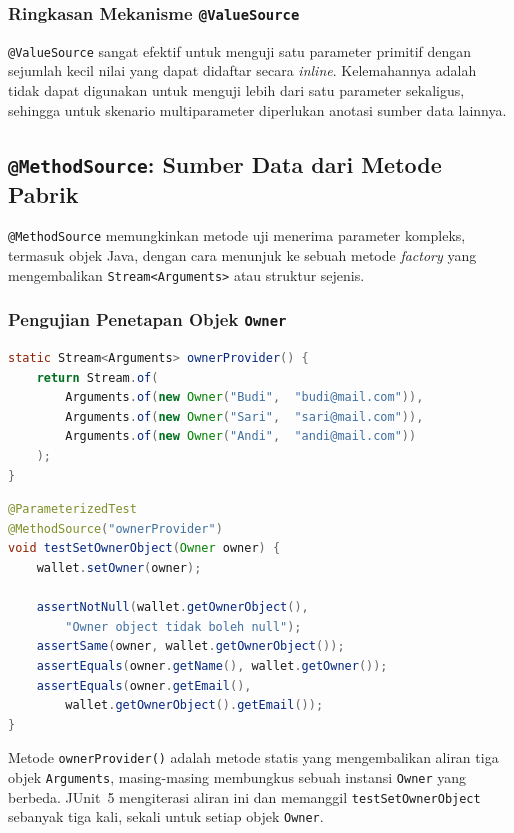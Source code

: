 \documentclass[12pt,a4paper]{article}
\begin{document}
\subsubsection{Ringkasan Mekanisme \texttt{@ValueSource}}

\texttt{@ValueSource} sangat efektif untuk menguji satu parameter primitif dengan
sejumlah kecil nilai yang dapat didaftar secara \textit{inline}.  Kelemahannya adalah
tidak dapat digunakan untuk menguji lebih dari satu parameter sekaligus, sehingga untuk
skenario multiparameter diperlukan anotasi sumber data lainnya.

\subsection{\texttt{@MethodSource}: Sumber Data dari Metode Pabrik}

\texttt{@MethodSource} memungkinkan metode uji menerima parameter kompleks, termasuk
objek Java, dengan cara menunjuk ke sebuah metode \textit{factory} yang mengembalikan
\texttt{Stream<Arguments>} atau struktur sejenis.

\subsubsection{Pengujian Penetapan Objek \texttt{Owner}}

\begin{lstlisting}[language=Java, caption={Metode pabrik data untuk \texttt{@MethodSource}}]
static Stream<Arguments> ownerProvider() {
    return Stream.of(
        Arguments.of(new Owner("Budi",  "budi@mail.com")),
        Arguments.of(new Owner("Sari",  "sari@mail.com")),
        Arguments.of(new Owner("Andi",  "andi@mail.com"))
    );
}
\end{lstlisting}

\begin{lstlisting}[language=Java, caption={Pengujian \texttt{setOwner(Owner)} dengan \texttt{@MethodSource}}]
@ParameterizedTest
@MethodSource("ownerProvider")
void testSetOwnerObject(Owner owner) {
    wallet.setOwner(owner);

    assertNotNull(wallet.getOwnerObject(),
        "Owner object tidak boleh null");
    assertSame(owner, wallet.getOwnerObject());
    assertEquals(owner.getName(), wallet.getOwner());
    assertEquals(owner.getEmail(),
        wallet.getOwnerObject().getEmail());
}
\end{lstlisting}

Metode \texttt{ownerProvider()} adalah metode statis yang mengembalikan aliran tiga
objek \texttt{Arguments}, masing-masing membungkus sebuah instansi \texttt{Owner} yang
berbeda.  JUnit~5 mengiterasi aliran ini dan memanggil \texttt{testSetOwnerObject}
sebanyak tiga kali, sekali untuk setiap objek \texttt{Owner}.
\end{document}
